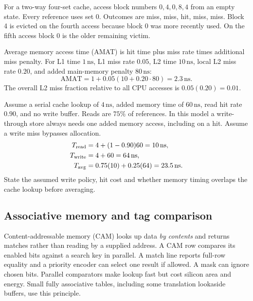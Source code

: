 \documentclass[12pt,a4paper]{article}
\begin{document}
\begin{tcolorbox}[examplebox,title={Trace LRU and calculate average memory access time}]
For a two-way four-set cache, access block numbers $0,4,0,8,4$ from an empty state. Every reference uses set 0. Outcomes are miss, miss, hit, miss, miss. Block 4 is evicted on the fourth access because block 0 was more recently used. On the fifth access block 0 is the older remaining victim.

Average memory access time (AMAT) is hit time plus miss rate times additional miss penalty. For L1 time $1\,\mathrm{ns}$, L1 miss rate $0.05$, L2 time $10\,\mathrm{ns}$, local L2 miss rate $0.20$, and added main-memory penalty $80\,\mathrm{ns}$:
\[
 \mathrm{AMAT}=1+0.05(10+0.20\cdot80)=2.3\,\mathrm{ns}.
\]
The overall L2 miss fraction relative to all CPU accesses is $0.05(0.20)=0.01$.
\end{tcolorbox}
\begin{tcolorbox}[examplebox,title={Weight read and write timings separately}]
Assume a serial cache lookup of $4\,\mathrm{ns}$, added memory time of $60\,\mathrm{ns}$, read hit rate $0.90$, and no write buffer. Reads are $75\%$ of references. In this model a write-through store always needs one added memory access, including on a hit. Assume a write miss bypasses allocation.
\[
\begin{aligned}
T_{\rm read}&=4+(1-0.90)60=10\,\mathrm{ns},\\
T_{\rm write}&=4+60=64\,\mathrm{ns},\\
T_{\rm avg}&=0.75(10)+0.25(64)=23.5\,\mathrm{ns}.
\end{aligned}
\]
State the assumed write policy, hit cost and whether memory timing overlaps the cache lookup before averaging.
\end{tcolorbox}

\subsection{Associative memory and tag comparison}
Content-addressable memory (CAM) looks up data \emph{by contents} and returns matches rather than reading by a supplied address. A CAM row compares its enabled bits against a search key in parallel. A match line reports full-row equality and a priority encoder can select one result if allowed. A mask can ignore chosen bits. Parallel comparators make lookup fast but cost silicon area and energy. Small fully associative tables, including some translation lookaside buffers, use this principle.
\end{document}
